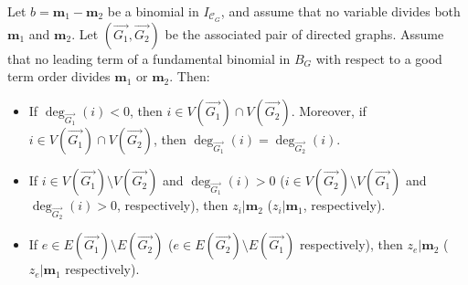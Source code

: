 \begin{lemm}\label{lem: technical}
    Let $b = \mathbf{m}_1 - \mathbf{m}_2$ be a binomial in $I_{\mathcal{C}_G}$, and assume that no variable divides both $\mathbf{m}_1$ and $\mathbf{m}_2$. Let $(\overrightarrow{G_1},\overrightarrow{G_2})$ be the associated pair of directed graphs. Assume that no leading term of a fundamental binomial in $B_G$ with respect to a good term order divides $\mathbf{m}_1$ or $\mathbf{m}_2$.
    Then:
    \begin{itemize}
        \item[(1)] If $\deg_{\overrightarrow{G_1}}(i)<0$, then $i\in V(\overrightarrow{G_1})\cap V(\overrightarrow{G_2})$.  Moreover, if $i\in V(\overrightarrow{G_1})\cap V(\overrightarrow{G_2})$, then $\deg_{\overrightarrow{G_1}}(i)= \deg_{\overrightarrow{G_2}}(i)$. 
        \item[(2)] If $i\in V(\overrightarrow{G_1})\setminus V(\overrightarrow{G_2})$ and $\deg_{\overrightarrow{G_1}}(i)>0$ ($i\in V(\overrightarrow{G_2})\setminus V(\overrightarrow{G_1})$ and $\deg_{\overrightarrow{G_2}}(i)>0 $, respectively), then $z_i| \mathbf{m}_2$ ($z_i| \mathbf{m}_1$, respectively).
       \item[(3)]  If $e\in E(\overrightarrow{G_1})\setminus E(\overrightarrow{G_2})$ ($e\in E(\overrightarrow{G_2})\setminus E(\overrightarrow{G_1})$ respectively), then $z_e|\mathbf{m}_2$ ($z_e|\mathbf{m}_1$ respectively).    \end{itemize}
\end{lemm}

